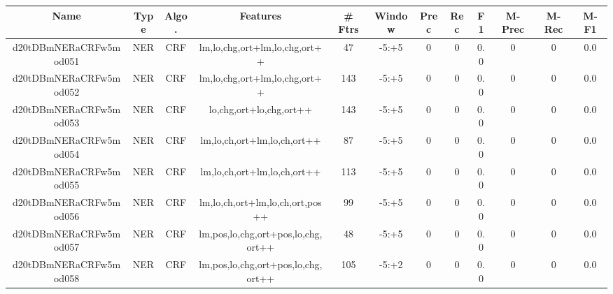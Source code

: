 \documentclass[a4paper]{article}
\begin{document}
\begin{landscape}
\begin{center}
\begin{tabular}{ |c|c|c|c|c|c|c|c|c|c|c|c|} 
 \hline
 	Name & Type & Algo. & Features & \# Ftrs & Window & Prec & Rec & F1 & M-Prec & M-Rec & M-F1\\
 \hline

 	

 
 	
 	\small{ d20tDBmNERaCRFw5mod051 } & \small{ NER} & \small{  CRF }  & lm,lo,chg,ort+lm,lo,chg,ort++  &  47 &  \small{  -5:+5 }  &  0 & 0 & 0.0  &  0 & 0 & 0.0 \\
 	

 
 	
 	\small{ d20tDBmNERaCRFw5mod052 } & \small{ NER} & \small{  CRF }  & lm,lo,chg,ort+lm,lo,chg,ort++  &  143 &  \small{  -5:+5 }  &  0 & 0 & 0.0  &  0 & 0 & 0.0 \\
 	

 
 	
 	\small{ d20tDBmNERaCRFw5mod053 } & \small{ NER} & \small{  CRF }  & lo,chg,ort+lo,chg,ort++  &  143 &  \small{  -5:+5 }  &  0 & 0 & 0.0  &  0 & 0 & 0.0 \\
 	

 
 	
 	\small{ d20tDBmNERaCRFw5mod054 } & \small{ NER} & \small{  CRF }  & lm,lo,ch,ort+lm,lo,ch,ort++  &  87 &  \small{  -5:+5 }  &  0 & 0 & 0.0  &  0 & 0 & 0.0 \\
 	

 
 	
 	\small{ d20tDBmNERaCRFw5mod055 } & \small{ NER} & \small{  CRF }  & lm,lo,ch,ort+lm,lo,ch,ort++  &  113 &  \small{  -5:+5 }  &  0 & 0 & 0.0  &  0 & 0 & 0.0 \\
 	

 
 	
 	\small{ d20tDBmNERaCRFw5mod056 } & \small{ NER} & \small{  CRF }  & lm,lo,ch,ort+lm,lo,ch,ort,pos++  &  99 &  \small{  -5:+5 }  &  0 & 0 & 0.0  &  0 & 0 & 0.0 \\
 	

 
 	
 	\small{ d20tDBmNERaCRFw5mod057 } & \small{ NER} & \small{  CRF }  & lm,pos,lo,chg,ort+pos,lo,chg,ort++  &  48 &  \small{  -5:+5 }  &  0 & 0 & 0.0  &  0 & 0 & 0.0 \\
 	

 
 	
 	\small{ d20tDBmNERaCRFw5mod058 } & \small{ NER} & \small{  CRF }  & lm,pos,lo,chg,ort+pos,lo,chg,ort++  &  105 &  \small{  -5:+2 }  &  0 & 0 & 0.0  &  0 & 0 & 0.0 \\
 	


\end{tabular}
\end{center}
\end{landscape}
\end{document}
